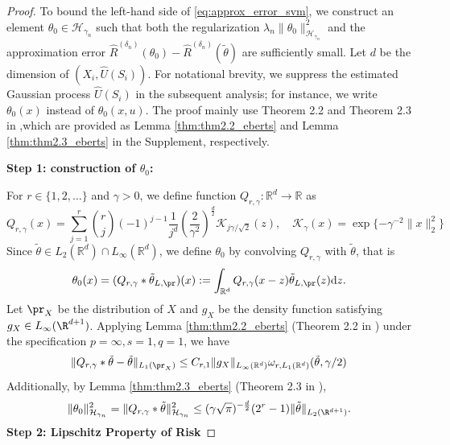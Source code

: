 \begin{proof}
\noindent To bound the left-hand side of \eqref{eq:approx_error_svm}, we construct an element  $\theta_0\in\mathcal{H}_{\gamma_n}$ such that both the regularization $\lambda_n\|\theta_0\|^2_{\mathcal{H}_{\gamma_n}}$ and the approximation error $\widehat R^{({\delta_n})}(\theta_0) -\widehat R^{({\delta_n})}(\tilde\theta)$ are sufficiently small. Let $d$ be the dimension of $(X_i,\widehat U(S_i))$. For notational brevity, we suppress the estimated Gaussian process $\widehat{U}(S_i)$ in the subsequent analysis; for instance, we write $\theta_0(x)$ instead of $\theta_0(x, u)$. The proof mainly use Theorem 2.2 and Theorem 2.3 in \citet{SVM2013},which are provided as Lemma \ref{thm:thm2.2_eberts} and Lemma \ref{thm:thm2.3_eberts} in the Supplement, respectively.

\noindent \textbf{Step 1: construction of $\theta_0$:}

\noindent For $r\in\{1,2,\ldots\}$ and $\gamma>0$, we define function $Q_{r,\gamma}: \mathbb{R}^d \to \mathbb{R}$ as
\begin{equation} \label{eq:eberts_Q_r}
Q_{r,\gamma}(x) = \sum_{j=1}^r \binom{r}{j}(-1)^{j-1} \frac{1}{j^d} \left(\frac{2}{\gamma^2}\right)^{\frac{d}{2}} \mathcal{K}_{j\gamma/\sqrt{2}}(z), \quad \mathcal{K}_{\gamma}(x) = \exp\{-\gamma^{-2} \|x\|_2^2\}
\end{equation}
Since $\tilde\theta \in L_2(\mathbb{R}^d) \cap L_\infty(\mathbb{R}^d)$, we define $\theta_0$ by convolving $Q_{r,\gamma}$ with $\tilde\theta$, that is
\[
\theta_0(x) = (Q_{r,\gamma} * \tilde\theta_{L,\pr})(x) := \int_{\mathbb{R}^d} Q_{r,\gamma}(x - z) \tilde\theta_{L,\pr}(z) \mathrm{d}z.
\]
Let $\pr_X$ be the distribution of $X$ and $g_X$ be the density function satisfying $g_X\in L_\infty(\R^{d+1})$. Applying Lemma \ref{thm:thm2.2_eberts} (Theorem 2.2 in \citet{SVM2013}) under the specification $p=\infty,s=1,q=1$, we have
\begin{equation}\label{eq:approx_error_excess_risk}
    \|Q_{r,\gamma} * \tilde\theta - \tilde\theta\|_{L_1(\pr_X)} \le C_{r,1} \|g_X\|_{L_\infty(\mathbb{R}^d)} \omega_{r,L_{1}(\mathbb{R}^d)}(\tilde\theta, \gamma/2)
\end{equation}
Additionally, by Lemma \ref{thm:thm2.3_eberts} (Theorem 2.3 in \citet{SVM2013}), 
\begin{equation}\label{eq:approx_error_regularizer}
    \|\theta_0\|^2_{\mathcal{H}_{\gamma_n}} = \|Q_{r,\gamma} * \tilde\theta\|^2_{\mathcal{H}_{\gamma_n}}\leq (\gamma\sqrt{\pi})^{-\frac{d}{2}}(2^r-1)\|\tilde\theta\|_{L_2(\R^{d+1})}.
\end{equation}
\noindent \textbf{Step 2: Lipschitz Property of Risk}


\end{proof}
